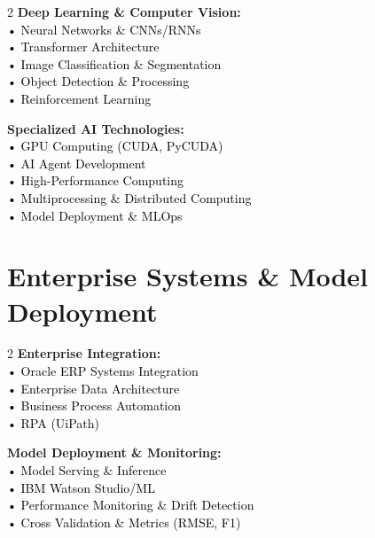 \documentclass[10pt, letterpaper]{article}
\newcommand{\skillcat}[1]{%
    \textbf{\color{darkBlue}#1}%
}
\newcommand{\skillitem}[1]{%
    \textcolor{black}{#1}%
}
\begin{document}
\vspace{0.3cm}

\begin{tcolorbox}[colback=lightGray!50, colframe=accentColor, arc=3mm, boxrule=1pt]
\begin{multicols}{2}
\skillcat{Deep Learning \& Computer Vision:} \\
\skillitem{• Neural Networks \& CNNs/RNNs} \\
\skillitem{• Transformer Architecture} \\
\skillitem{• Image Classification \& Segmentation} \\
\skillitem{• Object Detection \& Processing} \\
\skillitem{• Reinforcement Learning} \\

\columnbreak

\skillcat{Specialized AI Technologies:} \\
\skillitem{• GPU Computing (CUDA, PyCUDA)} \\
\skillitem{• AI Agent Development} \\
\skillitem{• High-Performance Computing} \\
\skillitem{• Multiprocessing \& Distributed Computing} \\
\skillitem{• Model Deployment \& MLOps} \\
\end{multicols}
\end{tcolorbox}

\section{Enterprise Systems \& Model Deployment}

\begin{tcolorbox}[colback=lightBlue!10, colframe=primaryColor, arc=3mm, boxrule=1pt]
\begin{multicols}{2}
\skillcat{Enterprise Integration:} \\
\skillitem{• Oracle ERP Systems Integration} \\
\skillitem{• Enterprise Data Architecture} \\
\skillitem{• Business Process Automation} \\
\skillitem{• RPA (UiPath)} \\

\columnbreak

\skillcat{Model Deployment \& Monitoring:} \\
\skillitem{• Model Serving \& Inference} \\
\skillitem{• IBM Watson Studio/ML} \\
\skillitem{• Performance Monitoring \& Drift Detection} \\
\skillitem{• Cross Validation \& Metrics (RMSE, F1)} \\
\end{multicols}
\end{tcolorbox}
\end{document}

